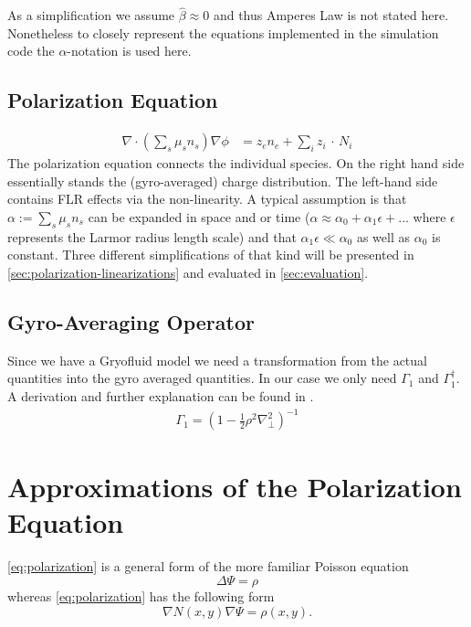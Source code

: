 As a simplification we assume $\hat{\beta} \approx 0$ and thus Amperes Law is not stated here. Nonetheless to closely represent the equations implemented in the simulation code the $\alpha$-notation is used here.

\subsection{Polarization Equation}

\begin{align}
    \nabla \cdot \left( \sum_s \mu_s n_s \right) \nabla \phi &= z_e n_e + \sum_i z_i \, \cdot \, N_i \label{eq:polarization}
\end{align}
The polarization equation connects the individual species. On the right hand side essentially stands the (gyro-averaged) charge distribution. The left-hand side contains \ac{FLR} effects via the non-linearity. A typical assumption is that $\alpha := \sum_s \mu_s n_s$ can be expanded in space and or time ($\alpha \approx \alpha_0 + \alpha_1 \epsilon + ...$ where $\epsilon$ represents the Larmor radius length scale) and that $\alpha_1 \epsilon \ll \alpha_0$ as well as $\alpha_0$ is constant. Three different simplifications of that kind will be presented in \autoref{sec:polarization-linearizations} and evaluated in \autoref{sec:evaluation}. 


\subsection{Gyro-Averaging Operator}
Since we have a Gryofluid model we need a transformation from the actual quantities into the gyro averaged quantities. In our case we only need $\Gamma_1$ and $\Gamma_1^\dagger$. A derivation and further explanation can be found in \cite{HeldDisseration}.
\begin{align}
    \Gamma_1 = \left(1- \frac{1}{2} \rho^2 \nabla_\perp^2\right)^{-1}
\end{align}


\section{Approximations of the Polarization Equation} \label{sec:polarization-linearizations}
\autoref{eq:polarization} is a general form of the more familiar Poisson equation
\begin{equation}\label{eq:linear-poisson-equation}
    \Delta \Psi = \rho 
\end{equation}
whereas \autoref{eq:polarization} has the following form
\begin{equation}\label{eq:general-poisson}
    \nabla N(x,y) \nabla \Psi = \rho(x,y).
\end{equation}

